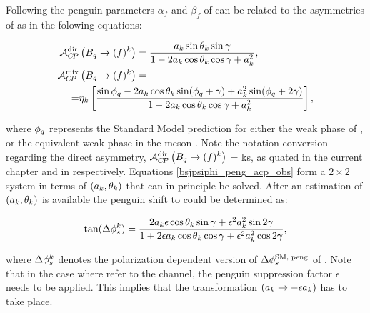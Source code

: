 Following \cite{Faller:2008gt} the penguin parameters $\alpha_f$ and $\beta_f$ of 
can be related to the \CP asymmetries of  as in the folowing equations:

\begin{subequations}
  \label{bsjpsiphi_peng_acp_obs}
  \begin{align}
    \mathcal{A}_{C\!P}^{\rm dir}&\left( B_q\rightarrow (f)^k \right) = \frac{ a_k \sin\theta_k \sin\gamma} {1 - 2 a_k \cos\theta_k \cos\gamma + a_k^{2}}, \label{bsjpsiphi_peng_acp_dir} \\
    \mathcal{A}_{C\!P}^{\rm mix}&\left( B_q\rightarrow (f)^k \right) = \nonumber \\
    = & \eta_k \left[ \frac{\sin\phi_q - 2a_k \cos\theta_k\sin(\phi_q+\gamma) + a_k^2 \sin(\phi_q+2\gamma)}
                                                                 {1 - 2 a_k \cos\theta_k \cos\gamma + a_k^{2}}  \right], \label{bsjpsiphi_peng_acp_mix}
  \end{align}
\end{subequations}

\noindent where $\phi_q$ represents the Standard Model prediction for either the weak phase \phis of ,
or the equivalent weak phase \phid in the \Bd meson \cite{PDG}. Note the notation conversion regarding the direct \CP
asymmetry, $\mathcal{A}_{C\!P}^{\rm dir}\left(B_q\rightarrow (f)^k\right)$ = \Acp{k}, as quated in the current chapter and in
 respectively. Equations \ref{bsjpsiphi_peng_acp_obs} form a $2\times2$ system in
terms of $(a_k,\theta_k)$ that can in principle be solved. After an estimation of $(a_k,\theta_k)$ is available the
penguin shift to \phis could be determined as:

\begin{equation}
\centering
\tan(\Delta\phis^k) = \frac{ 2\akPeng\epsilon\cos\thkPeng \sin\gamma + \epsilon^2\akPeng^2 \sin2\gamma}
                             {1 + 2\epsilon\akPeng \cos\thkPeng \cos\gamma + \epsilon^2\akPeng^2 \cos2\gamma},
\label{tandelta}
\end{equation}

\noindent where $\Delta\phi_{s}^k$ denotes the polarization dependent version of $\Delta\phi_{s}^{\tiny\text {SM, peng}}$ of .
Note that in the case where  refer to the \BsJpsiPhi channel, the penguin suppression factor
$\epsilon$ needs to be applied. This implies that the transformation $(a_k\rightarrow-\epsilon a_k)$ has to take place.

